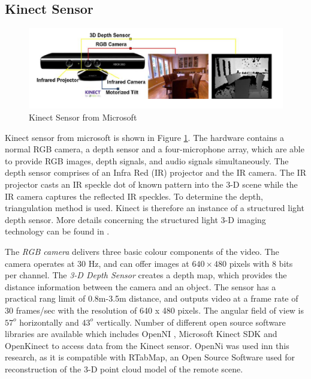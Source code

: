 \subsection{Kinect Sensor }
\begin{figure}
	\includegraphics[width=\linewidth,keepaspectratio]{Chapter7/fig/Kinect}
	\caption{Kinect Sensor from Microsoft}	\label{fig:Kinect}
\end{figure}
Kinect sensor from microsoft is shown in Figure \ref{fig:Kinect}. The hardware contains a normal RGB camera, a depth sensor and a four-microphone array, which are able to provide  RGB images,  depth signals, and audio signals simultaneously. The depth sensor comprises of an Infra Red (IR) projector and the IR camera. The IR projector casts an IR speckle dot of known  pattern into the 3-D scene while the IR camera captures the reflected IR speckles. To determine the depth, triangulation method is used.  Kinect is therefore an instance of a structured light depth sensor. More details concerning the structured light 3-D imaging technology can be found in \cite{geng2011structured}. 

The \textit{RGB camera}  delivers three basic colour components of the video. The camera operates at 30 Hz, and can offer images at $640\times480$ pixels with 8 bits per channel. The  \textit{3-D Depth Sensor} creates a depth map, which provides the distance information between the camera and an object. The sensor has a practical rang limit of 0.8m-3.5m distance, and outputs video at a frame rate of 30 frames/sec with the resolution of 640 x 480 pixels. The angular field of view is $57^o$ horizontally and $43^o$ vertically.
Number of different open source software libraries are available  which includes OpenNI \cite{openni}, Microsoft Kinect SDK  \cite{mssdk} and OpenKinect \cite{freenect} to access data from the Kinect sensor. OpenNi was used inn this research, as it is compatible with RTabMap, an Open Source Software used for reconstruction of the 3-D point cloud model of the  remote scene. 

